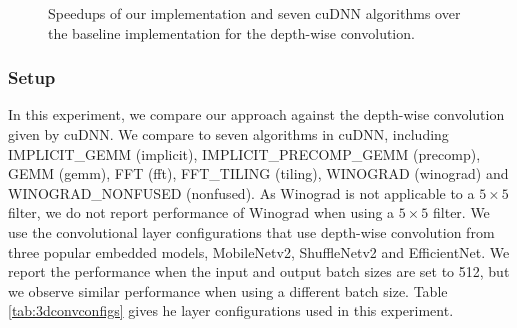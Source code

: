 \begin{figure}
\centering
	

\caption{Speedups of our implementation and seven cuDNN algorithms over the baseline implementation for the depth-wise convolution.}
\label{fig:3druntime}
\end{figure}


\subsubsection{Setup} In this experiment, we compare our approach against the depth-wise
convolution given by cuDNN. We compare to seven algorithms in cuDNN, including IMPLICIT\_GEMM (implicit), IMPLICIT\_PRECOMP\_GEMM
(precomp), GEMM (gemm), FFT (fft), FFT\_TILING (tiling), WINOGRAD (winograd) and WINOGRAD\_NONFUSED (nonfused). As Winograd is not
applicable  to a $5 \times 5$ filter, we do not report performance of Winograd when using a $5 \times 5$ filter. We use the convolutional
layer configurations that use depth-wise convolution from three popular embedded models, MobileNetv2, ShuffleNetv2 and EfficientNet. We
report the performance when the input and output batch sizes are set to 512, but we observe similar performance when using a different
batch size. Table \ref{tab:3dconvconfigs} gives he layer configurations used in this experiment.


